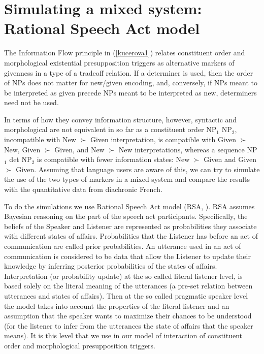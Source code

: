 \documentclass[output=paper,modfonts,nonflat]{langsci/langscibook}
\begin{document}


\section{Simulating a mixed system: Rational Speech Act model}
\label{section:rsa}

The Information Flow principle in (\ref{kucerova1}) relates constituent order and morphological existential presupposition triggers as alternative markers of givenness in a type of a tradeoff relation. If a determiner is used, then the order of NPs does not matter for new/given encoding, and, conversely, if NPs meant to be interpreted as given precede NPs meant to be interpreted as new, determiners need not be used. 

In terms of how they convey information structure, however, syntactic and morphological are not equivalent in so far as a constituent order NP$_{1}$ NP$_{2}$, incompatible with New $\succ$ Given interpretation, is compatible with Given $\succ$ New, Given $\succ$ Given, and New $\succ$ New interpretations, whereas a sequence NP$_{1}$ {\sc det} NP$_{2}$ is compatible with fewer information states: New $\succ$ Given and Given $\succ$ Given. Assuming that language users are aware of this, we can try to simulate the use of the two types of markers in a mixed system and compare the results with the quantitative data from diachronic French.

To do the simulations we use Rational Speech Act model (RSA, \citet{FrankGoodman:2012}). RSA assumes Bayesian reasoning on the part of the speech act participants. Specifically, the beliefs of the Speaker and Listener are represented as probabilities they associate with different states of affairs. Probabilities that the Listener has before an act of communication are called prior probabilities. An utterance used in an act of communication is considered to be data that allow the Listener to update their knowledge by inferring posterior probabilities of the states of affairs. Interpretation (or probability update) at the so called literal listener level, is based solely on the literal meaning of the utterances (a pre-set relation between utterances and states of affairs). Then at the so called pragmatic speaker level the model takes into account the properties of the literal listener and an assumption that the speaker wants to maximize their chances to be understood (for the listener to infer from the utterances the state of affairs that the speaker means). It is this level that we use in our model of interaction of constituent order and morphological presupposition triggers.
\end{document}

